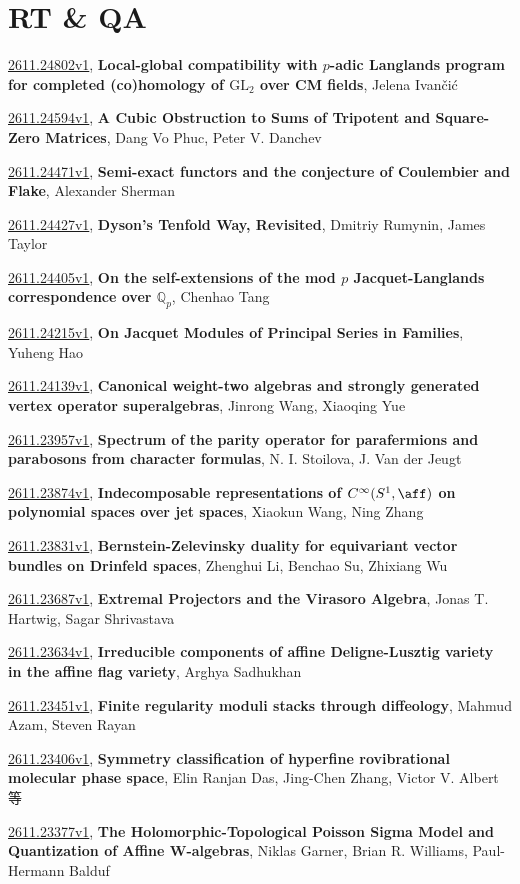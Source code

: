 \documentclass[9pt, a4paper]{article}
\theoremstyle{plain}
\theoremstyle{definition}
\theoremstyle{remark}
\newcommand{\arxiv}[3]{\href{https://arxiv.org/abs/#1}{#1}, \textbf{\textcolor{arxivblue}{#2}}, #3}
\begin{document}

\section{RT \& QA}
\arxiv{2611.24802v1}{Local-global compatibility with $p$-adic Langlands program for completed (co)homology of $\mathrm{GL}_2$ over CM fields}{Jelena Ivančić}

\arxiv{2611.24594v1}{A Cubic Obstruction to Sums of Tripotent and Square-Zero Matrices}{Dang Vo Phuc, Peter V. Danchev}

\arxiv{2611.24471v1}{Semi-exact functors and the conjecture of Coulembier and Flake}{Alexander Sherman}

\arxiv{2611.24427v1}{Dyson's Tenfold Way, Revisited}{Dmitriy Rumynin, James Taylor}

\arxiv{2611.24405v1}{On the self-extensions of the mod $p$ Jacquet-Langlands correspondence over $\mathbb{Q}_p$}{Chenhao Tang}

\arxiv{2611.24215v1}{On Jacquet Modules of Principal Series in Families}{Yuheng Hao}

\arxiv{2611.24139v1}{Canonical weight-two algebras and strongly generated vertex operator superalgebras}{Jinrong Wang, Xiaoqing Yue}

\arxiv{2611.23957v1}{Spectrum of the parity operator for parafermions and parabosons from character formulas}{N. I. Stoilova, J. Van der Jeugt}

\arxiv{2611.23874v1}{Indecomposable representations of $C^{\infty}(S^1,\aff)$ on polynomial spaces over jet spaces}{Xiaokun Wang, Ning Zhang}

\arxiv{2611.23831v1}{Bernstein-Zelevinsky duality for equivariant vector bundles on Drinfeld spaces}{Zhenghui Li, Benchao Su, Zhixiang Wu}

\arxiv{2611.23687v1}{Extremal Projectors and the Virasoro Algebra}{Jonas T. Hartwig, Sagar Shrivastava}

\arxiv{2611.23634v1}{Irreducible components of affine Deligne-Lusztig variety in the affine flag variety}{Arghya Sadhukhan}

\arxiv{2611.23451v1}{Finite regularity moduli stacks through diffeology}{Mahmud Azam, Steven Rayan}

\arxiv{2611.23406v1}{Symmetry classification of hyperfine rovibrational molecular phase space}{Elin Ranjan Das, Jing-Chen Zhang, Victor V. Albert 等}

\arxiv{2611.23377v1}{The Holomorphic-Topological Poisson Sigma Model and Quantization of Affine W-algebras}{Niklas Garner, Brian R. Williams, Paul-Hermann Balduf}
\end{document}
